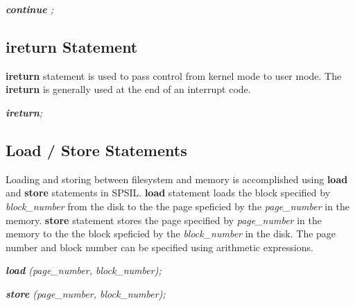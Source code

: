 \textit{\textbf{continue} ;}

\subsection{ireturn Statement}
\textbf{ireturn} statement is used to pass control from kernel mode to user mode. The \textbf{ireturn} is generally used at the end of an interrupt code.

\textit{\textbf{ireturn};}


\subsection{Load / Store Statements}
Loading and storing between filesystem and memory is accomplished using \textbf{load} and \textbf{store} statements in SPSIL. \textbf{load} statement loads the block specified by \textit{block\_number} from the disk to the the page speficied by the \textit{page\_number} in the memory. \textbf{store} statement stores the page specified by \textit{page\_number} in the memory to the the block speficied by the \textit{block\_number} in the disk. The page number and block number can be specified using arithmetic expressions.

\textit{\textbf{load} (page\_number, block\_number);}

\textit{\textbf{store} (page\_number, block\_number);}


%
